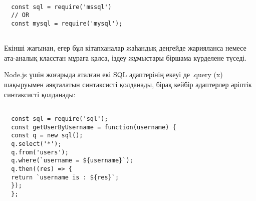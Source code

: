 \begin{verbatim}

  const sql = require('mssql')
  // OR
  const mysql = require('mysql');
  
\end{verbatim}

\begin{multicols}{2}

Екінші жағынан, егер бұл кітапханалар жаһандық деңгейде жарияланса
немесе ата-аналық класстан мұраға қалса, іздеу жұмыстары біршама
күрделене түседі.

Node.js үшін жоғарыда аталған екі SQL адаптерінің екеуі де .query (x)
шақыруымен аяқталатын синтаксисті қолданады, бірақ кейбір адаптерлер
әріптік синтаксисті қолданады:
\end{multicols}
\begin{verbatim}

  const sql = require('sql');
  const getUserByUsername = function(username) {
  const q = new sql();
  q.select('*');
  q.from('users');
  q.where(`username = ${username}`);
  q.then((res) => {
  return `username is : ${res}`;
  });
  };
  
\end{verbatim}
